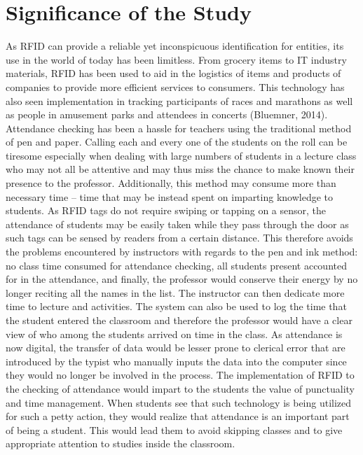 \section{Significance of the Study}

As RFID can provide a reliable yet inconspicuous identification for entities, its use in the world of today has been limitless. From grocery items to IT industry materials, RFID has been used to aid in the logistics of items and products of companies to provide more efficient services to consumers. This technology has also seen implementation in tracking participants of races and marathons as well as people in amusement parks and attendees in concerts (Bluemner, 2014).
Attendance checking has been a hassle for teachers using the traditional method of pen and paper. Calling each and every one of the students on the roll can be tiresome especially when dealing with large numbers of students in a lecture class who may not all be attentive and may thus miss the chance to make known their presence to the professor. Additionally, this method may consume more than necessary time – time that may be instead spent on imparting knowledge to students.
As RFID tags do not require swiping or tapping on a sensor, the attendance of students may be easily taken while they pass through the door as such tags can be sensed by readers from a certain distance. This therefore avoids the problems encountered by instructors with regards to the pen and ink method: no class time consumed for attendance checking, all students present accounted for in the attendance, and finally, the professor would conserve their energy by no longer reciting all the names in the list. The instructor can then dedicate more time to lecture and activities. The system can also be used to log the time that the student entered the classroom and therefore the professor would have a clear view of who among the students arrived on time in the class. As attendance is now digital, the transfer of data would be lesser prone to clerical error that are introduced by the typist who manually inputs the data into the computer since they would no longer be involved in the process.
The implementation of RFID to the checking of attendance would impart to the students the value of punctuality and time management. When students see that such technology is being utilized for such a petty action, they would realize that attendance is an important part of being a student. This would lead them to avoid skipping classes and to give appropriate attention to studies inside the classroom. 


